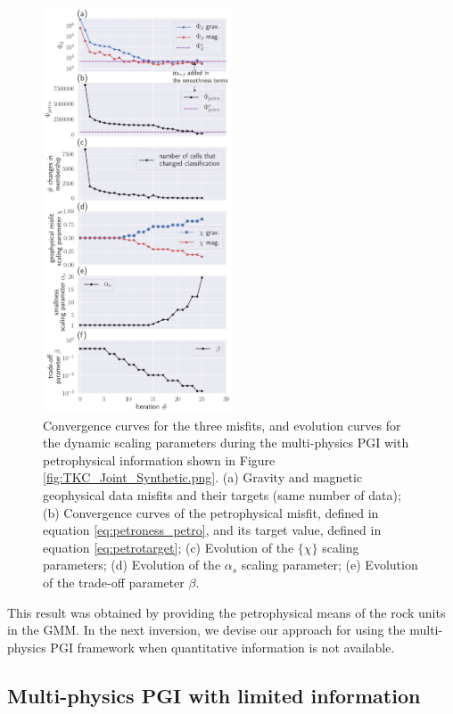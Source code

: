 \documentclass[extra, mreferee]{gji_joint} %
\begin{document}
\begin{figure}
\centering
\includegraphics[width=0.5\textwidth]{TKC_ConvergenceCurves.png}
\caption{Convergence curves for the three misfits, and evolution curves for the dynamic scaling parameters during the multi-physics PGI with petrophysical information shown in Figure \ref{fig:TKC_Joint_Synthetic.png}. (a) Gravity and magnetic geophysical data misfits and their targets (same number of data); (b) Convergence curves of the petrophysical misfit, defined in equation \eqref{eq:petroness_petro}, and its target value, defined in equation \eqref{eq:petrotarget}; (c) Evolution of the $\{\chi\}$ scaling parameters; (d) Evolution of the $\alpha_s$ scaling parameter; (e) Evolution of the trade-off parameter $\beta$.}
\label{fig:TKC_ConvergenceCurves.png}
\end{figure}


This result was obtained by providing the petrophysical means of the rock units in the GMM. In the next inversion, we devise our approach for using the multi-physics PGI framework when quantitative information is not available.

\subsection{Multi-physics PGI with limited information}
\end{document}
